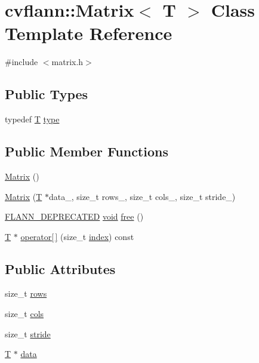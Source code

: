 \hypertarget{classcvflann_1_1Matrix}{\section{cvflann\-:\-:Matrix$<$ T $>$ Class Template Reference}
\label{classcvflann_1_1Matrix}
}


{\ttfamily \#include $<$matrix.\-h$>$}

\subsection*{Public Types}
\begin{DoxyCompactItemize}
\item 
typedef \hyperlink{calib3d_8hpp_a3efb9551a871ddd0463079a808916717}{T} \hyperlink{classcvflann_1_1Matrix_af0a591e2717db3ee411a96aa52a93719}{type}
\end{DoxyCompactItemize}
\subsection*{Public Member Functions}
\begin{DoxyCompactItemize}
\item 
\hyperlink{classcvflann_1_1Matrix_ab792018eb31c6c2962cd25968abde24b}{Matrix} ()
\item 
\hyperlink{classcvflann_1_1Matrix_a25a9c5ebe6a0c64ccfe6664a8c2d8bc6}{Matrix} (\hyperlink{calib3d_8hpp_a3efb9551a871ddd0463079a808916717}{T} $\ast$data\-\_\-, size\-\_\-t rows\-\_\-, size\-\_\-t cols\-\_\-, size\-\_\-t stride\-\_)
\item 
\hyperlink{defines_8h_a7c6f4b56c7a5c676e28c6c6ce0c94fe1}{F\-L\-A\-N\-N\-\_\-\-D\-E\-P\-R\-E\-C\-A\-T\-E\-D} \hyperlink{legacy_8hpp_a8bb47f092d473522721002c86c13b94e}{void} \hyperlink{classcvflann_1_1Matrix_a14b203d950b8496b269a66bf3c578eba}{free} ()
\item 
\hyperlink{calib3d_8hpp_a3efb9551a871ddd0463079a808916717}{T} $\ast$ \hyperlink{classcvflann_1_1Matrix_acf67c95f06cd195680b84970d5c543fc}{operator\mbox{[}$\,$\mbox{]}} (size\-\_\-t \hyperlink{core__c_8h_a750b5d744c39a06bfb13e6eb010e35d0}{index}) const 
\end{DoxyCompactItemize}
\subsection*{Public Attributes}
\begin{DoxyCompactItemize}
\item 
size\-\_\-t \hyperlink{classcvflann_1_1Matrix_aff6ee6abf050b1848fca59654c5669bc}{rows}
\item 
size\-\_\-t \hyperlink{classcvflann_1_1Matrix_a37b28f9c0d87c84cf396dcbe90fae71f}{cols}
\item 
size\-\_\-t \hyperlink{classcvflann_1_1Matrix_aadef95fb15a5de0464e44b9a3a3979ad}{stride}
\item 
\hyperlink{calib3d_8hpp_a3efb9551a871ddd0463079a808916717}{T} $\ast$ \hyperlink{classcvflann_1_1Matrix_a861faba1129cde780d5f0d0fbc568934}{data}
\end{DoxyCompactItemize}


